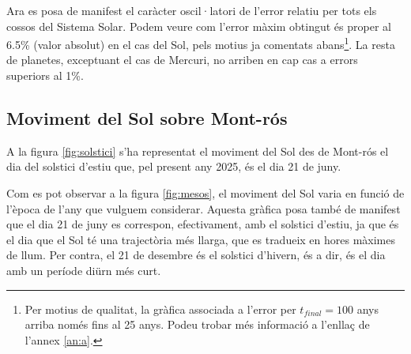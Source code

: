 \documentclass[10pt, twoside, a4paper]{article}
\begin{document}
Ara es posa de manifest el caràcter oscil·latori de l'error relatiu per tots els cossos del Sistema Solar. Podem veure com l'error màxim obtingut és proper al 6.5\% (valor absolut) en el cas del Sol, pels motius ja comentats abans\footnote{Per motius de qualitat, la gràfica associada a l'error per $t_{final}=100$ anys arriba només fins al 25 anys. Podeu trobar més informació a l'enllaç de l'annex \ref{an:a}.}. La resta de planetes, exceptuant el cas de Mercuri, no arriben en cap cas a errors superiors al 1\%.

\subsection{Moviment del Sol sobre Mont-rós}
A la figura \ref{fig:solstici} s'ha representat el moviment del Sol des de Mont-rós el dia del solstici d'estiu que, pel present any 2025, és el dia 21 de juny.

Com es pot observar a la figura \ref{fig:mesos}, el moviment del Sol varia en funció de l'època de l'any que vulguem considerar. Aquesta gràfica posa també de manifest que el dia 21 de juny es correspon, efectivament, amb el solstici d'estiu, ja que és el dia que el Sol té una trajectòria més llarga, que es tradueix en hores màximes de llum. Per contra, el 21 de desembre és el solstici d'hivern, és a dir, és el dia amb un període diürn més curt.
\end{document}
